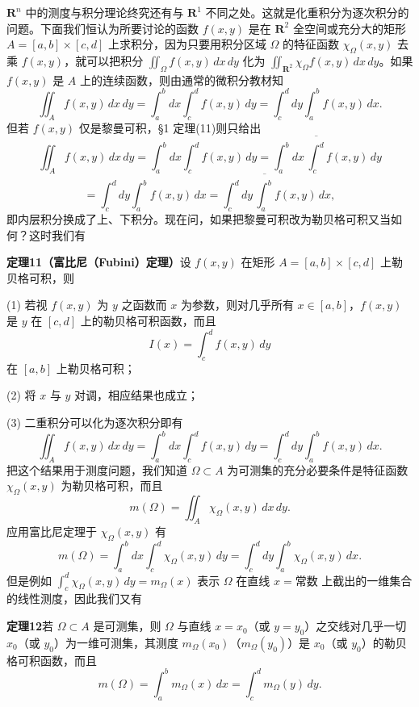 $\mathbf R^n$ 中的测度与积分理论终究还有与 $\mathbf R^1$ 不同之处。这就是化重积分为逐次积分的问题。下面我们恒认为所要讨论的函数 $f(x,y)$ 是在 $\mathbf R^2$ 全空间或充分大的矩形 $A=[a,b]\times[c,d]$ 上求积分，因为只要用积分区域 $\Omega$ 的特征函数 $\chi_\Omega(x,y)$ 去乘 $f(x,y)$，就可以把积分 $\iint_\Omega f(x,y)\,dx\,dy$ 化为 $\iint_{\mathbf R^2}\chi_\Omega f(x,y)\,dx\,dy$。如果 $f(x,y)$ 是 $A$ 上的连续函数，则由通常的微积分教材知
\begin{equation}
 \iint_A f(x,y)\,dx\,dy
 =\int_a^b dx\int_c^d f(x,y)\,dy
 =\int_c^d dy\int_a^b f(x,y)\,dx.
 \tag{24}
\end{equation}
但若 $f(x,y)$ 仅是黎曼可积，§1 定理(11)则只给出
\[
 \iint_A f(x,y)\,dx\,dy
 =\int_a^b dx\int_c^d f(x,y)\,dy
 =\int_a^b dx\,\overline{\int_c^d}f(x,y)\,dy
\]
\[
 =\int_c^d dy\int_a^b f(x,y)\,dx
 =\int_c^d dy\,\overline{\int_a^b}f(x,y)\,dx,
\]
即内层积分换成了上、下积分。现在问，如果把黎曼可积改为勒贝格可积又当如何？这时我们有

\noindent\textbf{定理11（富比尼（Fubini）定理）}\quad 设 $f(x,y)$ 在矩形 $A=[a,b]\times[c,d]$ 上勒贝格可积，则

(1) 若视 $f(x,y)$ 为 $y$ 之函数而 $x$ 为参数，则对几乎所有 $x\in[a,b]$，$f(x,y)$ 是 $y$ 在 $[c,d]$ 上的勒贝格可积函数，而且
\[
 I(x)=\int_c^d f(x,y)\,dy
\]
在 $[a,b]$ 上勒贝格可积；

(2) 将 $x$ 与 $y$ 对调，相应结果也成立；

(3) 二重积分可以化为逐次积分即有
\[
 \iint_A f(x,y)\,dx\,dy
 =\int_a^b dx\int_c^d f(x,y)\,dy
 =\int_c^d dy\int_a^b f(x,y)\,dx.
\]
把这个结果用于测度问题，我们知道 $\Omega\subset A$ 为可测集的充分必要条件是特征函数 $\chi_\Omega(x,y)$ 为勒贝格可积，而且
\[
 m(\Omega)=\iint_A\chi_\Omega(x,y)\,dx\,dy.
\]
应用富比尼定理于 $\chi_\Omega(x,y)$ 有
\[
 m(\Omega)=\int_a^b dx\int_c^d\chi_\Omega(x,y)\,dy
 =\int_c^d dy\int_a^b\chi_\Omega(x,y)\,dx.
\]
但是例如 $\int_c^d\chi_\Omega(x,y)\,dy=m_\Omega(x)$ 表示 $\Omega$ 在直线 $x=\text{常数}$ 上截出的一维集合的线性测度，因此我们又有

\noindent\textbf{定理12}\quad 若 $\Omega\subset A$ 是可测集，则 $\Omega$ 与直线 $x=x_0$（或 $y=y_0$）之交线对几乎一切 $x_0$（或 $y_0$）为一维可测集，其测度 $m_\Omega(x_0)$（$m_\Omega(y_0)$）是 $x_0$（或 $y_0$）的勒贝格可积函数，而且
\begin{equation}
 m(\Omega)=\int_a^b m_\Omega(x)\,dx=\int_c^d m_\Omega(y)\,dy.
 \tag{25}
\end{equation}

